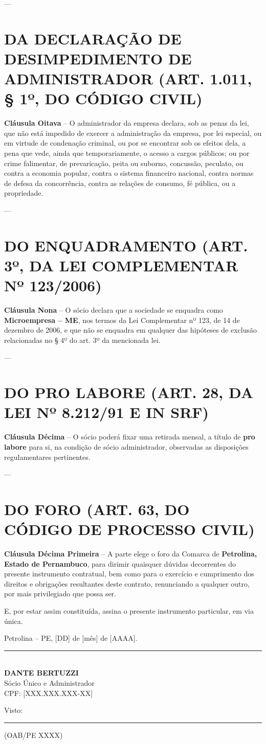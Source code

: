 \documentclass[12pt,a4paper]{article}
\newcommand{\secao}[1]{\section*{{\large\textbf{#1}}}}
\begin{document}
---
\secao{DA DECLARAÇÃO DE DESIMPEDIMENTO DE ADMINISTRADOR (ART. 1.011, § 1º, DO CÓDIGO CIVIL)}

\noindent\textbf{Cláusula Oitava} -- O administrador da empresa declara, sob as penas da lei, que não está impedido de exercer a administração da empresa, por lei especial, ou em virtude de condenação criminal, ou por se encontrar sob os efeitos dela, a pena que vede, ainda que temporariamente, o acesso a cargos públicos; ou por crime falimentar, de prevaricação, peita ou suborno, concussão, peculato, ou contra a economia popular, contra o sistema financeiro nacional, contra normas de defesa da concorrência, contra as relações de consumo, fé pública, ou a propriedade.

---
\secao{DO ENQUADRAMENTO (ART. 3º, DA LEI COMPLEMENTAR Nº 123/2006)}

\noindent\textbf{Cláusula Nona} -- O sócio declara que a sociedade se enquadra como \textbf{Microempresa -- ME}, nos termos da Lei Complementar nº 123, de 14 de dezembro de 2006, e que não se enquadra em qualquer das hipóteses de exclusão relacionadas no § 4º do art. 3º da mencionada lei.

---
\secao{DO PRO LABORE (ART. 28, DA LEI Nº 8.212/91 E IN SRF)}

\noindent\textbf{Cláusula Décima} -- O sócio poderá fixar uma retirada mensal, a título de \textbf{pro labore} para si, na condição de sócio administrador, observadas as disposições regulamentares pertinentes.

---
\secao{DO FORO (ART. 63, DO CÓDIGO DE PROCESSO CIVIL)}

\noindent\textbf{Cláusula Décima Primeira} -- A parte elege o foro da Comarca de \textbf{Petrolina, Estado de Pernambuco}, para dirimir quaisquer dúvidas decorrentes do presente instrumento contratual, bem como para o exercício e cumprimento dos direitos e obrigações resultantes deste contrato, renunciando a qualquer outro, por mais privilegiado que possa ser.

\vspace{1cm}

\noindent E, por estar assim constituída, assina o presente instrumento particular, em via única.

\vspace{1cm}

\noindent Petrolina -- PE, [DD] de [mês] de [AAAA].

\vspace{2cm}

\noindent\rule{8cm}{0.4pt}\\
\textbf{DANTE BERTUZZI}\\
Sócio Único e Administrador\\
CPF: [XXX.XXX.XXX-XX]

\vspace{2cm}

\noindent Visto: \rule{5cm}{0.4pt} (OAB/PE XXXX)
\end{document}
